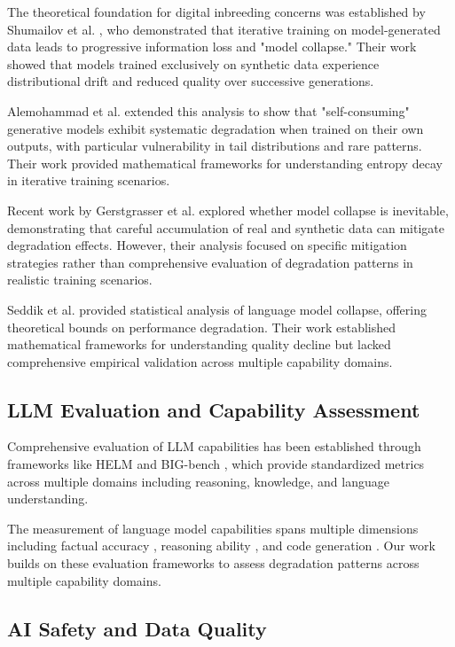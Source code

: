 \documentclass{article}
\begin{document}
The theoretical foundation for digital inbreeding concerns was established by Shumailov et al. \cite{shumailov2023curse}, who demonstrated that iterative training on model-generated data leads to progressive information loss and "model collapse." Their work showed that models trained exclusively on synthetic data experience distributional drift and reduced quality over successive generations.

Alemohammad et al. \cite{alemohammad2023self} extended this analysis to show that "self-consuming" generative models exhibit systematic degradation when trained on their own outputs, with particular vulnerability in tail distributions and rare patterns. Their work provided mathematical frameworks for understanding entropy decay in iterative training scenarios.

Recent work by Gerstgrasser et al. \cite{gerstgrasser2024model} explored whether model collapse is inevitable, demonstrating that careful accumulation of real and synthetic data can mitigate degradation effects. However, their analysis focused on specific mitigation strategies rather than comprehensive evaluation of degradation patterns in realistic training scenarios.

Seddik et al. \cite{seddik2024bad} provided statistical analysis of language model collapse, offering theoretical bounds on performance degradation. Their work established mathematical frameworks for understanding quality decline but lacked comprehensive empirical validation across multiple capability domains.

\subsection{LLM Evaluation and Capability Assessment}

Comprehensive evaluation of LLM capabilities has been established through frameworks like HELM \cite{liang2022holistic} and BIG-bench \cite{srivastava2022beyond}, which provide standardized metrics across multiple domains including reasoning, knowledge, and language understanding.

The measurement of language model capabilities spans multiple dimensions including factual accuracy \cite{hendrycks2020measuring}, reasoning ability \cite{clark2018think}, and code generation \cite{brown2020language}. Our work builds on these evaluation frameworks to assess degradation patterns across multiple capability domains.

\subsection{AI Safety and Data Quality}
\end{document}
